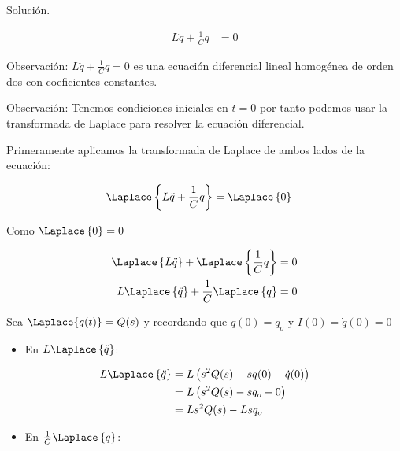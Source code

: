 

 Solución.

 \begin{align*}
    L\ddot{q} + \frac{1}{C} q &= 0 
\end{align*}

Observación: $L\ddot{q} + \frac{1}{C} q = 0 $ es una ecuación diferencial lineal
homogénea de orden dos con coeficientes constantes.


Observación: Tenemos condiciones iniciales en $t=0$ por tanto podemos
usar la transformada de Laplace para resolver la ecuación diferencial.

\vspace*{0.3 cm}

Primeramente aplicamos la transformada de Laplace de ambos lados de la ecuación:

\begin{align*}
    \Laplace \left\{ L\ddot{q} + \frac{1}{C} q \right\} &= \Laplace \left\{ 0 \right\}
\end{align*}

Como $ \Laplace \left\{ 0 \right\} = 0 $

\begin{align*}
    \Laplace \left\{ L\ddot{q} \right\} + \Laplace \left\{\frac{1}{C} q \right\} &= 0 \\
    L \Laplace \left\{ \ddot{q} \right\} + \frac{1}{C} \Laplace \left\{q  \right\} &= 0
\end{align*}

Sea $\Laplace \{ q(t) \} = Q(s)$ y recordando que $ q(0)= q_{o} $ y $I(0) = \dot{q} (0)=0$ 

\begin{itemize}
    \item En $L \Laplace \left\{ \ddot{q} \right\} $: 
\end{itemize}

\begin{align*}
    L \Laplace \left\{ \ddot{q} \right\} &= L \left( s^{2}Q(s) -sq(0) - \dot{q}(0) \right) \\
                                         &= L \left( s^{2}Q(s) -sq_{o} - 0 \right) \\
                                         &= L s^{2}Q(s) -Lsq_{o}
\end{align*}

\begin{itemize}
    \item En $\frac{1}{C} \Laplace \left\{ q \right\} $: 
\end{itemize}

